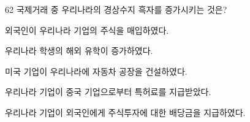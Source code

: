 \begin{question}{62}
국제거래 중 우리나라의 경상수지 흑자를 증가시키는 것은?
\begin{choices}
  \item 외국인이 우리나라 기업의 주식을 매입하였다.
  \item 우리나라 학생의 해외 유학이 증가하였다.
  \item 미국 기업이 우리나라에 자동차 공장을 건설하였다.
  \item 우리나라 기업이 중국 기업으로부터 특허료를 지급받았다.
  \item 우리나라 기업이 외국인에게 주식투자에 대한 배당금을 지급하였다.
\end{choices}
\end{question}
